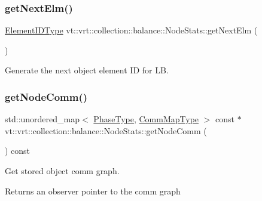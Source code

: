 \subsubsection{\texorpdfstring{get\+Next\+Elm()}{getNextElm()}}
{\footnotesize\ttfamily \hyperlink{namespacevt_1_1vrt_1_1collection_1_1balance_a14c8d2c972f2913aa3f1636e5be0a120}{Element\+I\+D\+Type} vt\+::vrt\+::collection\+::balance\+::\+Node\+Stats\+::get\+Next\+Elm (\begin{DoxyParamCaption}{ }\end{DoxyParamCaption})}



Generate the next object element ID for LB. 

\mbox{\label{structvt_1_1vrt_1_1collection_1_1balance_1_1_node_stats_a236c9f6b9ba7446a35cbc1052949d558}} 
\subsubsection{\texorpdfstring{get\+Node\+Comm()}{getNodeComm()}}
{\footnotesize\ttfamily std\+::unordered\+\_\+map$<$ \hyperlink{namespacevt_a46ce6733d5cdbd735d561b7b4029f6d7}{Phase\+Type}, \hyperlink{namespacevt_1_1vrt_1_1collection_1_1balance_a10860c956804d644db54a16012352728}{Comm\+Map\+Type} $>$ const  $\ast$ vt\+::vrt\+::collection\+::balance\+::\+Node\+Stats\+::get\+Node\+Comm (\begin{DoxyParamCaption}{ }\end{DoxyParamCaption}) const}



Get stored object comm graph. 

\begin{DoxyReturn}{Returns}
an observer pointer to the comm graph 
\end{DoxyReturn}
\mbox{\label{structvt_1_1vrt_1_1collection_1_1balance_1_1_node_stats_a5b34d26f9e10f7ff3ceb92b95f0ed2f6}} 
